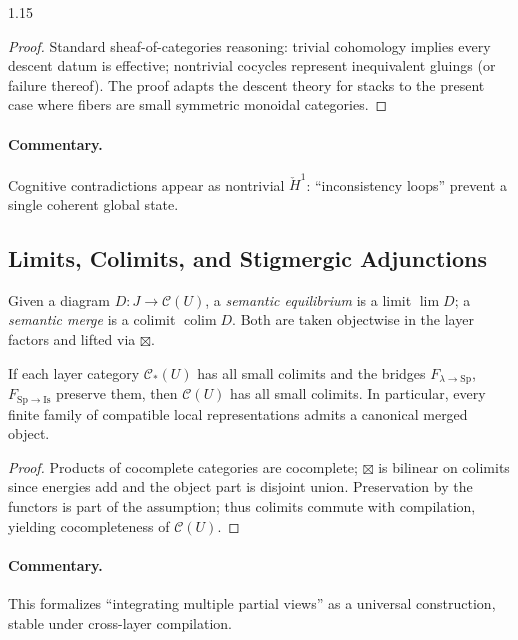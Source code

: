 \documentclass[12pt,a4paper]{article}
\begin{document}
\begin{spacing}{1.15}
\begin{proof}
Standard sheaf-of-categories reasoning: trivial cohomology implies every descent datum is effective; nontrivial cocycles represent inequivalent gluings (or failure thereof). The proof adapts the descent theory for stacks to the present case where fibers are small symmetric monoidal categories.
\end{proof}

\paragraph{Commentary.}
Cognitive contradictions appear as nontrivial $\check{H}^{1}$: “inconsistency loops” prevent a single coherent global state.

\subsection{Limits, Colimits, and Stigmergic Adjunctions}

\begin{definition}
Given a diagram $D\colon J\to\mathscr{C}(U)$, a \emph{semantic equilibrium} is a limit $\lim D$; a \emph{semantic merge} is a colimit $\operatorname{colim} D$. Both are taken objectwise in the layer factors and lifted via $\boxtimes$.
\end{definition}

\begin{theorem}
\label{thm:colimit}
If each layer category $\mathcal{C}_{*}(U)$ has all small colimits and the bridges $F_{\lambda\to\mathrm{Sp}}$, $F_{\mathrm{Sp}\to\mathrm{Is}}$ preserve them, then $\mathscr{C}(U)$ has all small colimits. In particular, every finite family of compatible local representations admits a canonical merged object.
\end{theorem}

\begin{proof}
Products of cocomplete categories are cocomplete; $\boxtimes$ is bilinear on colimits since energies add and the object part is disjoint union. Preservation by the functors is part of the assumption; thus colimits commute with compilation, yielding cocompleteness of $\mathscr{C}(U)$.
\end{proof}

\paragraph{Commentary.}
This formalizes “integrating multiple partial views” as a universal construction, stable under cross-layer compilation.


\end{spacing}
\end{document}
